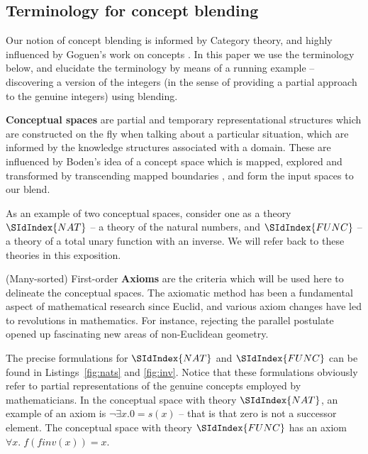 \subsection{Terminology for concept blending}
Our notion of concept blending is informed by Category theory, and
highly influenced by Goguen's work on concepts \cite{Go05f}. In this paper we
use the terminology below, and elucidate the terminology by means of a
running example -- discovering a version of the integers (in the sense
of providing a partial approach to the genuine integers) using
blending.

{\bf Conceptual spaces} are partial and temporary representational
structures which are constructed on the fly when talking about a
particular situation, which are informed by the knowledge structures
associated with a domain. These are influenced by Boden's idea of a
concept space which is mapped, explored and transformed by
transcending mapped boundaries \cite{boden}, and form the input spaces
to our blend. 

As an example of two conceptual spaces, consider one as a theory
$\SIdIndex{NAT}$ --
a theory of the natural numbers, and $\SIdIndex{FUNC}$ -- a theory of a total
unary function with an inverse. 
We will refer back to these theories in this exposition.

(Many-sorted) First-order {\bf Axioms} are the criteria which will be
used here to delineate the conceptual
spaces. The axiomatic method has been a fundamental aspect of
mathematical research since Euclid, and various axiom changes have led
to revolutions in mathematics. For instance, 
rejecting
the parallel postulate opened up fascinating new areas of
non-Euclidean geometry.

The precise formulations for $\SIdIndex{NAT}$ and $ \SIdIndex{FUNC}$ can
be found in Listings~\ref{fig:nats} and \ref{fig:inv}. 
Notice that these formulations obviously refer to 
partial representations of the genuine concepts
employed by mathematicians.  
In the conceptual space with theory $\SIdIndex{NAT}$, an example of an axiom is $\neg \exists x. 0 =
s(x)$ -- that is that zero is not a successor element.
The conceptual space with theory $\SIdIndex{FUNC}$ has an axiom
$\forall x.\;f(finv(x)) = x$. 

